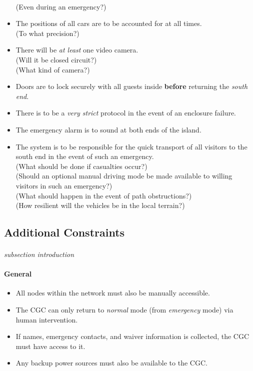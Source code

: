 \documentclass[12pt]{article}
\begin{document}
\begin{itemize}
        \\(Even during an emergency?)
        \item The positions of all cars are to be accounted for at all times. 
        \\(To what precision?)
        \item There will be \textit{at least} one video camera. 
        \\(Will it be closed circuit?) 
        \\(What kind of camera?)
        \item Doors are to lock securely with all guests inside \textbf{before} returning the \textit{south end}.
        \item There is to be a \textit{very strict} protocol in the event of an enclosure failure.
        \item The emergency alarm is to sound at both ends of the island.
        \item The system is to be responsible for the quick transport of all visitors to the south end in the event of such an emergency.
        \\(What should be done if casualties occur?)
        \\(Should an optional manual driving mode be made available to willing visitors in such an emergency?)
        \\(What should happen in the event of path obstructions?)
        \\(How resilient will the vehicles be in the local terrain?) 
    \end{itemize}
    \subsection{Additional Constraints}
    \paragraph{} \textit{subsection introduction}
    \paragraph{General}
    \begin{itemize}
        \item[] All nodes within the network must also be manually accessible.
        \item[] The CGC can only return to \textit{normal} mode (from \textit{emergency} mode) via human intervention.
        \item[] If names, emergency contacts, and waiver information is collected, the CGC must have access to it.
        \item[] Any backup power sources must also be available to the CGC.
    \end{itemize}
    
\end{document}
